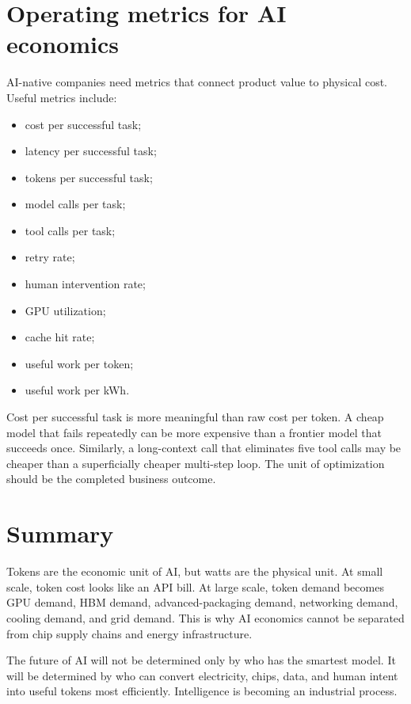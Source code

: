 \section{Operating metrics for AI economics}

AI-native companies need metrics that connect product value to physical cost. Useful metrics include:

\begin{itemize}[leftmargin=*]
  \item cost per successful task;
  \item latency per successful task;
  \item tokens per successful task;
  \item model calls per task;
  \item tool calls per task;
  \item retry rate;
  \item human intervention rate;
  \item GPU utilization;
  \item cache hit rate;
  \item useful work per token;
  \item useful work per kWh.
\end{itemize}

Cost per successful task is more meaningful than raw cost per token. A cheap model that fails repeatedly can be more expensive than a frontier model that succeeds once. Similarly, a long-context call that eliminates five tool calls may be cheaper than a superficially cheaper multi-step loop. The unit of optimization should be the completed business outcome.

\section{Summary}

Tokens are the economic unit of AI, but watts are the physical unit. At small scale, token cost looks like an API bill. At large scale, token demand becomes GPU demand, HBM demand, advanced-packaging demand, networking demand, cooling demand, and grid demand. This is why AI economics cannot be separated from chip supply chains and energy infrastructure.

The future of AI will not be determined only by who has the smartest model. It will be determined by who can convert electricity, chips, data, and human intent into useful tokens most efficiently. Intelligence is becoming an industrial process.
